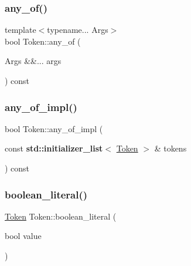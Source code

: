 \subsubsection{\texorpdfstring{any\+\_\+of()}{any\_of()}}
{\footnotesize\ttfamily template$<$typename... Args$>$ \\
bool Token\+::any\+\_\+of (\begin{DoxyParamCaption}\item[{Args \&\&...}]{args }\end{DoxyParamCaption}) const\hspace{0.3cm}{\ttfamily [inline]}}

\mbox{\label{class_token_abefa8f417ddd59dcb37a2cfd357a51bf}} 
\subsubsection{\texorpdfstring{any\+\_\+of\+\_\+impl()}{any\_of\_impl()}}
{\footnotesize\ttfamily bool Token\+::any\+\_\+of\+\_\+impl (\begin{DoxyParamCaption}\item[{const \textbf{ std\+::initializer\+\_\+list}$<$ \hyperlink{class_token}{Token} $>$ \&}]{tokens }\end{DoxyParamCaption}) const\hspace{0.3cm}{\ttfamily [inline]}}

\mbox{\label{class_token_a95cc3830383b9cfb05ae2b29ca776c41}} 
\subsubsection{\texorpdfstring{boolean\+\_\+literal()}{boolean\_literal()}}
{\footnotesize\ttfamily \hyperlink{class_token}{Token} Token\+::boolean\+\_\+literal (\begin{DoxyParamCaption}\item[{bool}]{value }\end{DoxyParamCaption})\hspace{0.3cm}{\ttfamily [static]}}

\mbox{\label{class_token_a15dc839f68c100e6041c7ca089ea9005}} 
